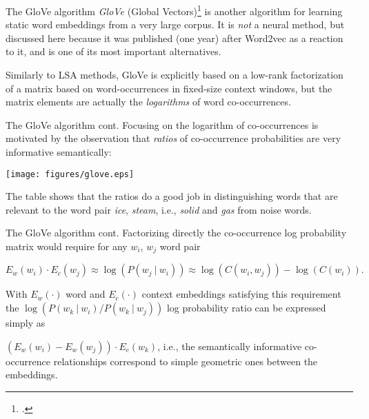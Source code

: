 \documentclass[style=upen, size=14pt]{powerdot}
\newcommand{\gold}{\color{arany}}
\theoremstyle{definition}
\begin{document}
\begin{slide}[toc=Algorithm]{The GloVe algorithm}
  \emph{\gold GloVe} (Global Vectors)\footnote{\cite{pennington2014glove}.} is
  another algorithm for learning static word embeddings from a very large
  corpus. It is \emph{not} a neural method, but discussed here because it was
  published (one year) after Word2vec as a reaction to it, and is one of its
  most important alternatives.\bigskip

  Similarly to LSA methods, GloVe is explicitly based on a low-rank
  factorization of a matrix based on word-occurrences in fixed-size context
  windows, but the matrix elements are actually the \emph{logarithms} of word
  co-occurrences.
\end{slide}

\begin{slide}[toc=]{The GloVe algorithm cont.} 
  Focusing on the logarithm of co-occurrences is motivated by the observation
  that \emph{ratios} of co-occurrence probabilities are very informative
  semantically:
  \begin{center}
    \texttt{[image: figures/glove.eps]}
  \end{center}
  The table shows that the ratios do a good job in distinguishing words that are
  relevant to the word pair \emph{ice}, \emph{steam}, i.e., \emph{solid} and
  \emph{gas} from noise words.
\end{slide}

\begin{slide}[toc=]{The GloVe algorithm cont.} 
  Factorizing directly the co-occurrence log probability matrix would require
  for any $w_i$, $w_j$ word pair
  \begin{small}
    $$
    E_w(w_i)\cdot E_c(w_j)\approx \log (P(w_j~|~ w_i)) \approx \log (C(w_i, w_j)) - \log (C(w_i)).
    $$
  \end{small}
  With $E_w(\cdot)$ word and $E_c(\cdot)$ context embeddings satisfying this
  requirement the $\log(P(w_k~|~w_i)/P(w_k~|~w_j))$ log probability ratio can be
  expressed simply as

  $(E_w(w_i) - E_w(w_j))\cdot E_c(w_k)$, i.e., the semantically informative
  co-occurrence relationships correspond to simple geometric ones between the embeddings.
\end{slide}
\end{document}
